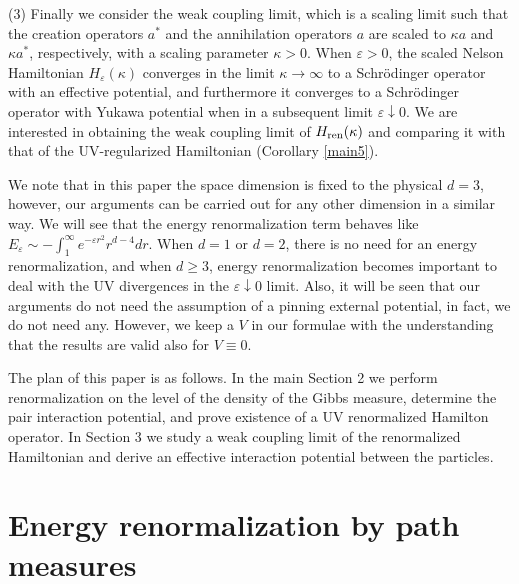 \documentclass[12pt]{article}
\providecommand{\hni}{\hn_\ren }
\providecommand{\hn}{H}%
\providecommand{\add}{a^\ast}
\providecommand{\1}{\mathbb{1}}
\providecommand{\eps}{\varepsilon}
\providecommand{\ren}{{\rm ren}}
\begin{document}
\medskip
\noindent
(3)
Finally we consider the weak coupling limit, which  is a scaling limit such that the creation operators $\add$
and the annihilation operators $a$ are scaled to $\kappa a$ and $\kappa \add$, respectively, with a scaling
parameter $\kappa>0$. When $\eps>0$, the scaled Nelson Hamiltonian $\hn_\eps(\kappa)$ converges in the limit
$\kappa \to \infty$ to a Schr\"odinger operator with an effective potential, and furthermore it converges to
a Schr\"odinger operator with Yukawa potential when in a subsequent limit $\eps\downarrow 0$. We are interested
in obtaining the weak coupling limit of $\hni(\kappa)$ and comparing it with that of the UV-regularized
Hamiltonian (Corollary \ref{main5}).


\bigskip
We note that in this paper the space dimension is fixed to the physical $d=3$, however, our arguments can
be carried out for any other dimension in a similar way. We will see that the energy renormalization term
behaves like $E_\eps\sim -\int_1^\infty e^{-\eps r^2} r^{d-4} dr$. When $d=1$ or $d=2$, there is no need
for an energy renormalization, and when $d\geq 3$, energy renormalization becomes important to deal with
the UV divergences in the $\eps\downarrow 0$ limit. Also, it will be seen that our arguments do not need
the assumption of a pinning external potential, in fact, we do not need any. However, we keep a $V$ in our
formulae with the understanding that the results are valid also for $V \equiv 0$.


\bigskip
\noindent
The plan of this paper is as follows. In the main Section 2 we perform renormalization on the level of the
density of the Gibbs measure, determine the pair interaction potential, and prove existence of a UV
renormalized Hamilton operator. In Section 3 we study a weak coupling limit of the renormalized Hamiltonian
and derive an effective interaction potential between the particles.


\section{Energy renormalization by path measures}
\end{document}

